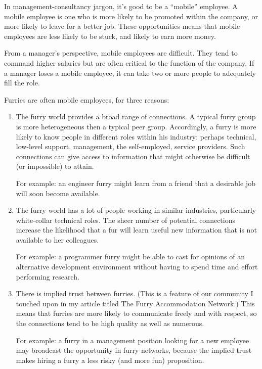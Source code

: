 In management-consultancy jargon, it's good to be a ``mobile'' employee. A mobile employee is one who is more likely to be promoted within the company, or more likely to leave for a better job. These opportunities means that mobile employees are less likely to be stuck, and likely to earn more money.

From a manager's perspective, mobile employees are difficult. They tend to command higher salaries but are often critical to the function of the company. If a manager loses a mobile employee, it can take two or more people to adequately fill the role.

Furries are often mobile employees, for three reasons:

\begin{enumerate}
  \item The furry world provides a broad range of connections. A typical furry group is more heterogeneous then a typical peer group. Accordingly, a furry is more likely to know people in different roles within his industry: perhaps technical, low-level support, management, the self-employed, service providers. Such connections can give access to information that might otherwise be difficult (or impossible) to attain.

  For example: an engineer furry might learn from a friend that a desirable job will soon become available.

  \item The furry world has a lot of people working in similar industries, particularly white-collar technical roles. The sheer number of potential connections increase the likelihood that a fur will learn useful new information that is not available to her colleagues.

  For example: a programmer furry might be able to cast for opinions of an alternative development environment without having to spend time and effort performing research.

  \item There is implied trust between furries. (This is a feature of our community I touched upon in my article titled The Furry Accommodation Network.) This means that furries are more likely to communicate freely and with respect, so the connections tend to be high quality as well as numerous.

  For example: a furry in a management position looking for a new employee may broadcast the opportunity in furry networks, because the implied trust makes hiring a furry a less risky (and more fun) proposition.
\end{enumerate}

